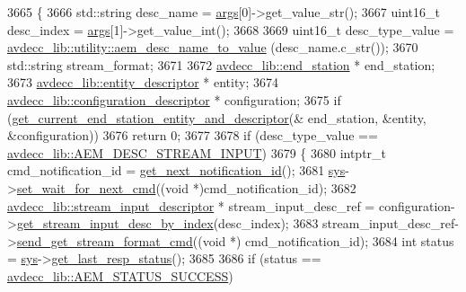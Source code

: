 \begin{DoxyCode}
3665 \{
3666     std::string desc\_name = \hyperlink{namespaceastime__fitline_a8187411843a6284ffb964ef3fb9fcab3}{args}[0]->get\_value\_str();
3667     uint16\_t desc\_index = \hyperlink{namespaceastime__fitline_a8187411843a6284ffb964ef3fb9fcab3}{args}[1]->get\_value\_int();
3668 
3669     uint16\_t desc\_type\_value = \hyperlink{namespaceavdecc__lib_1_1utility_a9f6076e32fa227555a95b6e95ea1e29b}{avdecc\_lib::utility::aem\_desc\_name\_to\_value}
      (desc\_name.c\_str());
3670     std::string stream\_format;
3671 
3672     \hyperlink{classavdecc__lib_1_1end__station}{avdecc\_lib::end\_station} * end\_station;
3673     \hyperlink{classavdecc__lib_1_1entity__descriptor}{avdecc\_lib::entity\_descriptor} * entity;
3674     \hyperlink{classavdecc__lib_1_1configuration__descriptor}{avdecc\_lib::configuration\_descriptor} * configuration;
3675     \textcolor{keywordflow}{if} (\hyperlink{classcmd__line_ac2d4611fba7db03d436a2e3c1e64828e}{get\_current\_end\_station\_entity\_and\_descriptor}(&
      end\_station, &entity, &configuration))
3676         \textcolor{keywordflow}{return} 0;
3677 
3678     \textcolor{keywordflow}{if} (desc\_type\_value == \hyperlink{namespaceavdecc__lib_ac7b7d227e46bc72b63ee9e9aae15902fa00d002e47651a1b007d50f9f2da51e53}{avdecc\_lib::AEM\_DESC\_STREAM\_INPUT})
3679     \{
3680         intptr\_t cmd\_notification\_id = \hyperlink{classcmd__line_a57486218387d1aa9d262eb7c176154ad}{get\_next\_notification\_id}();
3681         \hyperlink{classcmd__line_a485db4800e331cb4052c447fdf5d154e}{sys}->\hyperlink{classavdecc__lib_1_1system_a26b769584f10225077da47583edda33e}{set\_wait\_for\_next\_cmd}((\textcolor{keywordtype}{void} *)cmd\_notification\_id);
3682         \hyperlink{classavdecc__lib_1_1stream__input__descriptor}{avdecc\_lib::stream\_input\_descriptor} * stream\_input\_desc\_ref = 
      configuration->\hyperlink{classavdecc__lib_1_1configuration__descriptor_a69cfe9032cea21937b4153878f8a925c}{get\_stream\_input\_desc\_by\_index}(desc\_index);
3683         stream\_input\_desc\_ref->\hyperlink{classavdecc__lib_1_1stream__input__descriptor_a4ba58b32ff7b9f5d961a0a5eb46d4c6c}{send\_get\_stream\_format\_cmd}((\textcolor{keywordtype}{void} *)
      cmd\_notification\_id);
3684         \textcolor{keywordtype}{int} status = \hyperlink{classcmd__line_a485db4800e331cb4052c447fdf5d154e}{sys}->\hyperlink{classavdecc__lib_1_1system_aa63e8d1a4e51f695cdcccc9340922407}{get\_last\_resp\_status}();
3685 
3686         \textcolor{keywordflow}{if} (status == \hyperlink{namespaceavdecc__lib_affd436edb2cecd20cfd784a84f852b2bac947077909cb590b84f4b5db413080e0}{avdecc\_lib::AEM\_STATUS\_SUCCESS})

\end{DoxyCode}
